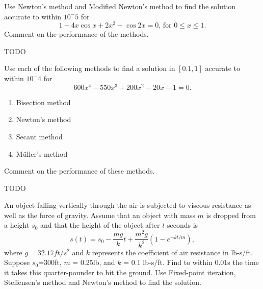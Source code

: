 \documentclass[10pt]{jhwhw}
\begin{document}
	\inputminted{text}{p4.results}

\problem{}

	Use Newton's method and Modified Newton's method to find the solution accurate to within $10^-5$ for
	$$
		1 - 4x\cos x + 2x^2 + \cos 2x = 0\text{, for }0 \leq x \leq 1.
	$$
	Comment on the performance of the methods.

\solution

	TODO

\problem{}

	Use each of the following methods to find a solution in $[0.1, 1]$ accurate to within $10^-4$ for
	$$
		600x^4 - 550x^3 + 200x^2 - 20x - 1 = 0.
	$$
	\begin{enumerate}
		\item Bisection method
		\item Newton's method
		\item Secant method
		\item M\"{u}ller's method
	\end{enumerate}
	Comment on the performance of these methods.

\solution

	TODO

\problem{}

\solution

	An object falling vertically through the air is subjected to viscous resistance as well as the
	force of gravity. Assume that an object with mass $m$ is dropped from a height $s_0$ and that the height of the
	object after $t$ seconds is
	$$
		s(t) = s_0 - \frac{mg}{k}t + \frac{m^2g}{k^2}(1-e^{-kt/m}),
	$$
	where $g=32.17 ft/s^2$ and $k$ represents the coefficient of air resistance in lb-s/ft.
	Suppose $s_0$=300ft, $m$ = 0.25lb, and $k$ = 0.1 lb-s/ft. Find to within 0.01s the time it takes
	this quarter-pounder to hit the ground. Use Fixed-point iteration, Steffensen's method and Newton's method
	to find the solution.
\end{document}
